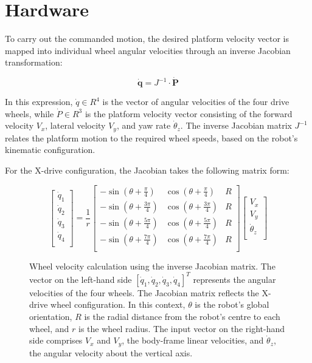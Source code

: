 \chapter{Hardware}
To carry out the commanded motion, the desired platform velocity vector is mapped into individual wheel angular velocities through an inverse Jacobian transformation:

\[
\dot{\mathbf{q}} = J^{-1} \cdot \dot{\mathbf{P}}
\]

In this expression, $\dot{q} \in R^4$ is the vector of angular velocities of the four drive wheels, while $\dot{P} \in R^3$ is the platform velocity vector consisting of the forward velocity $V_x$, lateral velocity $V_y$, and yaw rate $\dot{\theta}_z$. The inverse Jacobian matrix $J^{-1}$ relates the platform motion to the required wheel speeds, based on the robot's kinematic configuration.

For the X-drive configuration, the Jacobian takes the following matrix form:

\begin{figure}[H]
\[
\begin{bmatrix}
\dot{q}_1 \\
\dot{q}_2 \\
\dot{q}_3 \\
\dot{q}_4 \\
\end{bmatrix}
=
\frac{1}{r}
\begin{bmatrix}
-\sin(\theta + \frac{\pi}{4}) & \cos(\theta + \frac{\pi}{4}) & R \\
-\sin(\theta + \frac{3\pi}{4}) & \cos(\theta + \frac{3\pi}{4}) & R \\
-\sin(\theta + \frac{5\pi}{4}) & \cos(\theta + \frac{5\pi}{4}) & R \\
-\sin(\theta + \frac{7\pi}{4}) & \cos(\theta + \frac{7\pi}{4}) & R \\
\end{bmatrix}
\begin{bmatrix}
V_x \\
V_y \\
\dot{\theta}_z \\
\end{bmatrix}
\]
\caption{Wheel velocity calculation using the inverse Jacobian matrix. The vector on the left-hand side \( [\dot{q}_1, \dot{q}_2, \dot{q}_3, \dot{q}_4]^T \) represents the angular velocities of the four wheels. The Jacobian matrix reflects the X-drive wheel configuration. In this context, \( \theta \) is the robot's global orientation, \( R \) is the radial distance from the robot's centre to each wheel, and \( r \) is the wheel radius. The input vector on the right-hand side comprises \( V_x \) and \( V_y \), the body-frame linear velocities, and \( \dot{\theta}_z \), the angular velocity about the vertical axis.}
\label{fig:matrix-wheel}
\end{figure}


